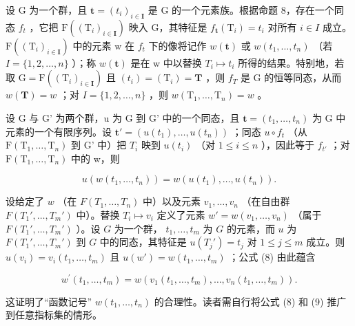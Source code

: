设 G 为一个群，且 \(\mathbf{t} = (t_{i})_{i \in \mathbf{I}}\) 是 G 的一个元素族。根据命题 8，存在一个同态 \(f_{t}\) ，它把 \(\mathrm{F}((\mathrm{T}_{i})_{i \in \mathbf{I}})\) 映入 G，其特征是 \(f_{\mathbf{t}}(\mathrm{T}_{i}) = t_{i}\) 对所有 \(i \in I\) 成立。 \(\mathrm{F}((\mathrm{T}_{i})_{i \in \mathbf{I}})\) 中的元素 w 在 \(f_{t}\) 下的像将记作 \(w(\mathbf{t})\) 或 \(w(t_{1}, \ldots, t_{n})\) （若 \(I = \{1, 2, \ldots, n\}\) ）；称 \(w(\mathbf{t})\) 是在 w 中以替换 \(T_{i} \mapsto t_{i}\) 所得的结果。特别地，若取 \(\mathrm{G} = \mathrm{F}((\mathrm{T}_{i})_{i \in \mathbf{I}})\) 且 \((t_{i}) = (\mathrm{T}_{i}) = \mathbf{T}\) ，则 \(f_{T}\) 是 G 的恒等同态，从而 \(w(\mathbf{T}) = w\) ；对 \(I = \{1, 2, \ldots, n\}\) ，则 \(w(\mathrm{T}_{1}, \ldots, \mathrm{T}_{n}) = w\) 。

设 G 与 G' 为两个群，u 为 G 到 G' 中的一个同态，且 \(\mathbf{t} = (t_{1}, \ldots, t_{n})\) 为 G 中元素的一个有限序列。设 \(\mathbf{t}' = (u(t_{1}), \ldots, u(t_{n}))\) ；同态 \(u \circ f_{t}\) （从 \(\mathrm{F}(\mathrm{T}_{1}, \ldots, \mathrm{T}_{n})\) 到 G' 中）把 \(T_{i}\) 映到 \(u(t_{i})\) （对 \(1 \leqslant i \leqslant n\) ），因此等于 \(f_{t'}\) ；对 \(\mathrm{F}(\mathrm{T}_{1}, \ldots, \mathrm{T}_{n})\) 中的 w，则

\[
u (w (t _ {1}, \dots , t _ {n})) = w (u (t _ {1}), \dots , u (t _ {n})).\tag{8}
\]

设给定了 \(w\) （在 \(F(T_1, \ldots, T_n)\) 中）以及元素 \(v_1, \ldots, v_n\) （在自由群 \(F(T_1', \ldots, T_m')\) 中）。替换 \(T_i \mapsto v_i\) 定义了元素 \(w' = w(v_1, \ldots, v_n)\) （属于 \(F(T_1', \ldots, T_m')\) ）。设 \(G\) 为一个群， \(t_1, \ldots, t_m\) 为 \(G\) 的元素，而 \(u\) 为 \(F(T_1', \ldots, T_m')\) 到 \(G\) 中的同态，其特征是 \(u(T_j') = t_j\) 对 \(1 \leqslant j \leqslant m\) 成立。则 \(u(v_i) = v_i(t_1, \ldots, t_m)\) 且 \(u(w') = w(t_1, \ldots, t_m)\) ；公式 (8) 由此蕴含

\[
w ^ {\prime} (t _ {1}, \dots , t _ {m}) = w (v _ {1} (t _ {1}, \dots , t _ {m}), \dots , v _ {n} (t _ {1}, \dots , t _ {m})).\tag{9}
\]

这证明了“函数记号” \(w(t_{1},\ldots,t_{n})\) 的合理性。读者需自行将公式 (8) 和 (9) 推广到任意指标集的情形。

